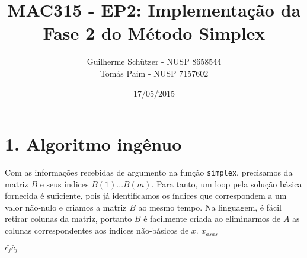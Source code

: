 \documentclass[a4paper]{article}
\title{MAC315 - EP2: Implementação da Fase 2 do Método Simplex}
\author{
	Guilherme Schützer - NUSP 8658544 \\
	Tomás Paim         - NUSP 7157602
}
\date{17/05/2015}
\begin{document}
\maketitle

\section{1. Algoritmo ingênuo}
Com as informações recebidas de argumento na função \texttt{simplex}, precisamos da matriz $B$ e seus índices $B(1)...B(m)$. Para tanto, um loop pela solução básica fornecida é suficiente, pois já identificamos os índices que correspondem a um valor não-nulo e criamos a matriz $B$ ao mesmo tempo. Na linguagem, é fácil retirar colunas da matriz, portanto $B$ é facilmente criada ao eliminarmos de $A$ as colunas correspondentes aos índices não-básicos de $x$. $x_{asas}$

$\bar{c_{j}} \bar{c}_{j}$
\end{document}
